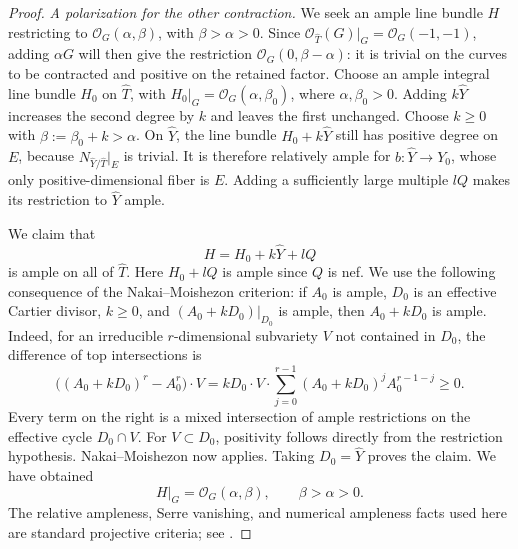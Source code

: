 \begin{proof}


\smallskip
\noindent\emph{A polarization for the other contraction.}
We seek an ample line bundle $H$ restricting to
$\mathcal O_G(\alpha,\beta)$, with $\beta>\alpha>0$.
Since $\mathcal O_{\widehat T}(G)|_G=\mathcal O_G(-1,-1)$,
adding $\alpha G$ will then give the restriction
$\mathcal O_G(0,\beta-\alpha)$: it is trivial on the curves to be
contracted and positive on the retained factor.
Choose an ample integral line bundle $H_0$ on $\widehat T$, with
$H_0|_G=\mathcal O_G(\alpha,\beta_0)$, where $\alpha,\beta_0>0$.
Adding $k\widehat Y$ increases the second degree by $k$ and leaves the
first unchanged.  Choose $k\ge0$ with $\beta:=\beta_0+k>\alpha$.
On $\widehat Y$, the line bundle $H_0+k\widehat Y$ still has positive
degree on $E$, because $N_{\widehat Y/\widehat T}|_E$ is trivial.
It is therefore relatively ample for $b:\widehat Y\to Y_0$, whose
only positive-dimensional fiber is $E$.  Adding a sufficiently large
multiple $lQ$ makes its restriction to $\widehat Y$ ample.

We claim that
\[
 H=H_0+k\widehat Y+lQ
\]
is ample on all of $\widehat T$.  Here $H_0+lQ$ is ample since $Q$
is nef.  We use the following consequence of the Nakai--Moishezon
criterion: if $A_0$ is ample, $D_0$ is an effective Cartier divisor,
$k\ge0$, and $(A_0+kD_0)|_{D_0}$ is ample, then $A_0+kD_0$ is ample.
Indeed, for an irreducible $r$-dimensional subvariety $V$ not contained
in $D_0$, the difference of top intersections is
\[
 \bigl((A_0+kD_0)^r-A_0^r\bigr)\cdot V
 = kD_0\cdot V\cdot
   \sum_{j=0}^{r-1}(A_0+kD_0)^j A_0^{r-1-j}\ge0.
\]
Every term on the right is a mixed intersection of ample restrictions
on the effective cycle $D_0\cap V$.  For $V\subset D_0$, positivity
follows directly from the restriction hypothesis.  Nakai--Moishezon
now applies.  Taking $D_0=\widehat Y$ proves the claim.  We have obtained
\begin{equation}\label{proj:ample-degrees}
 H|_G=\mathcal O_G(\alpha,\beta),\qquad \beta>\alpha>0.
\end{equation}
The relative ampleness, Serre vanishing, and numerical ampleness facts
used here are standard projective criteria; see \cite{Hartshorne}.


\end{proof}
